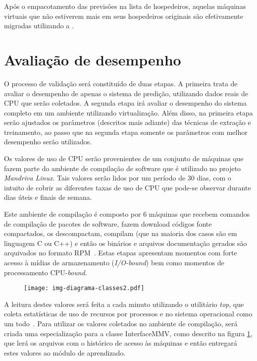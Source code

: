 Após o empacotamento das previsões na lista de hospedeiros, aquelas
máquinas virtuais que não estiverem mais em seus hospedeiros originais
são efetivamente migradas utilizando a \libvirt{}.

\section{Avaliação de desempenho}\label{sec:desemp}


O processo de validação será constituído de duas etapas. A primeira trata de
avaliar o desempenho de apenas o sistema de predição, utilizando dados reais de
CPU que serão coletados. A segunda etapa irá avaliar o desempenho do sistema
completo em um ambiente utilizando virtualização. Além disso, na primeira etapa
serão ajustados os parâmetros (descritos mais adiante) das técnicas de extração
e treinamento, ao passo que na segunda etapa somente os parâmetros com melhor
desempenho serão utilizados.

Os valores de uso de CPU serão provenientes de um conjunto de máquinas que
fazem parte do ambiente de compilação de software que é utilizado no projeto
\emph{Mandriva Linux}. Tais valores serão lidos por um período de 30 dias, com
o intuito de cobrir as diferentes taxas de uso de CPU que pode-se observar
durante dias úteis e finais de semana.

Este ambiente de compilação é composto por $6$ máquinas que recebem
comandos de compilação de pacotes de software, fazem download códigos fonte
compactados, os descompactam, compilam (que na maioria dos casos são em
linguagem C ou C++) e então os binários e arquivos documentação gerados são
arquivados no formato RPM~\cite{ewing1996rpm}. Estas etapas apresentam
momentos com forte acesso à mídias de armazenamento (\emph{I/O-bound}) bem
como momentos de processamento CPU-\emph{bound}.

\begin{figure}[htp]
\centering
\texttt{[image: img-diagrama-classes2.pdf]}
\label{fig:diagramaclasses2}
\end{figure}

A leitura destes valores será feita a cada minuto utilizando o utilitário
\emph{top}, que coleta estatísticas de uso de recursos por processos e no
sistema operacional como um todo~\cite{andresen2004monitoring}. Para utilizar
os valores coletados no ambiente de compilação, será criada uma especialização
para a classe InterfaceMMV, como descrito na figura
\ref{fig:diagramaclasses2}, que lerá os arquivos com o histórico de acesso às
máquinas e então entregará estes valores ao módulo de aprendizado.

